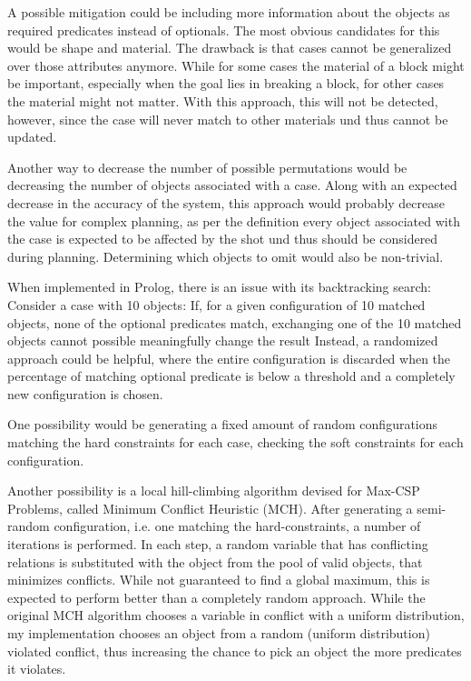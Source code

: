 A possible mitigation could be including more information about the objects as required predicates instead of optionals.
The most obvious candidates for this would be shape and material.
The drawback is that cases cannot be generalized over those attributes anymore. While for some cases the material of a block might be important, especially when the goal lies in breaking a block, for other cases the material might not matter.
With this approach, this will not be detected, however, since the case will never match to other materials und thus cannot be updated.

Another way to decrease the number of possible permutations would be decreasing the number of objects associated with a case. Along with an expected decrease in the accuracy of the system, this approach would probably decrease the value for complex planning, as per the definition every object associated with the case is expected to be affected by the shot und thus should be considered during planning.
Determining which objects to omit would also be non-trivial.

When implemented in Prolog, there is an issue with its backtracking search: Consider a case with 10 objects: If, for a given configuration of 10 matched objects, none of the optional predicates match, exchanging one of the 10 matched objects cannot possible meaningfully change the result
Instead, a randomized approach could be helpful, where the entire configuration is discarded when the percentage of matching optional predicate is below a threshold and a completely new configuration is chosen.

One possibility would be generating a fixed amount of random configurations matching the hard constraints for each case, checking the soft constraints for each configuration.

Another possibility is a local hill-climbing algorithm devised for Max-CSP Problems, called Minimum Conflict Heuristic (MCH)\cite{Minton1992MinimizingCA}. After generating a semi-random configuration, i.e. one matching the hard-constraints, a number of iterations is performed. In each step, a random variable that has conflicting relations is substituted with the object from the pool of valid objects, that minimizes conflicts. While not guaranteed to find a global maximum, this is expected to perform better than a completely random approach.
While the original MCH algorithm chooses a variable in conflict with a uniform distribution, my implementation chooses an object from a random (uniform distribution) violated conflict, thus increasing the chance to pick an object the more predicates it violates.

